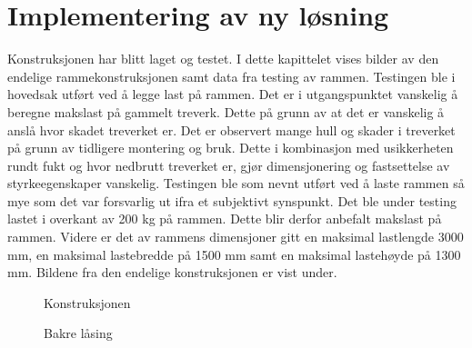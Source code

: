 \section{Implementering av ny løsning}
Konstruksjonen har blitt laget og testet. I dette kapittelet vises bilder av den endelige rammekonstruksjonen samt data fra testing av rammen. 
Testingen ble i hovedsak utført ved å legge last på rammen. Det er i utgangspunktet vanskelig å beregne makslast på gammelt treverk. Dette på grunn av at det er vanskelig å anslå hvor skadet treverket er. Det er observert mange hull og skader i treverket på grunn av tidligere montering og bruk. Dette i kombinasjon med usikkerheten rundt fukt og hvor nedbrutt treverket er, gjør dimensjonering og fastsettelse av styrkeegenskaper vanskelig.
Testingen ble som nevnt utført ved å laste rammen så mye som det var forsvarlig ut ifra et subjektivt synspunkt. Det ble under testing lastet i overkant av 200 kg på rammen. Dette blir derfor anbefalt makslast på rammen. Videre er det av rammens dimensjoner gitt en maksimal lastlengde 3000 mm, en maksimal lastebredde på 1500 mm samt en maksimal lastehøyde på 1300 mm.
Bildene fra den endelige konstruksjonen er vist under.     
\begin{figure}[H]
\centering   
{}
\caption{Konstruksjonen}
\label{B1}
\end{figure}
\begin{figure}[H]
\centering   
{}
\caption{Bakre låsing}
\label{B2}
\end{figure}
